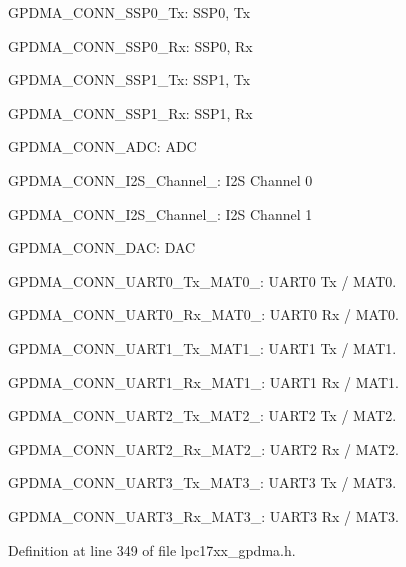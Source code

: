 \begin{DoxyItemize}
\item \-G\-P\-D\-M\-A\-\_\-\-C\-O\-N\-N\-\_\-\-S\-S\-P0\-\_\-\-Tx\-: \-S\-S\-P0, \-Tx
\item \-G\-P\-D\-M\-A\-\_\-\-C\-O\-N\-N\-\_\-\-S\-S\-P0\-\_\-\-Rx\-: \-S\-S\-P0, \-Rx
\item \-G\-P\-D\-M\-A\-\_\-\-C\-O\-N\-N\-\_\-\-S\-S\-P1\-\_\-\-Tx\-: \-S\-S\-P1, \-Tx
\item \-G\-P\-D\-M\-A\-\_\-\-C\-O\-N\-N\-\_\-\-S\-S\-P1\-\_\-\-Rx\-: \-S\-S\-P1, \-Rx
\item \-G\-P\-D\-M\-A\-\_\-\-C\-O\-N\-N\-\_\-\-A\-D\-C\-: \-A\-D\-C
\item \-G\-P\-D\-M\-A\-\_\-\-C\-O\-N\-N\-\_\-\-I2\-S\-\_\-\-Channel\-\_\-: \-I2\-S \-Channel 0
\item \-G\-P\-D\-M\-A\-\_\-\-C\-O\-N\-N\-\_\-\-I2\-S\-\_\-\-Channel\-\_\-: \-I2\-S \-Channel 1
\item \-G\-P\-D\-M\-A\-\_\-\-C\-O\-N\-N\-\_\-\-D\-A\-C\-: \-D\-A\-C
\item \-G\-P\-D\-M\-A\-\_\-\-C\-O\-N\-N\-\_\-\-U\-A\-R\-T0\-\_\-\-Tx\-\_\-\-M\-A\-T0\-\_\-: \-U\-A\-R\-T0 \-Tx / \-M\-A\-T0.
\item \-G\-P\-D\-M\-A\-\_\-\-C\-O\-N\-N\-\_\-\-U\-A\-R\-T0\-\_\-\-Rx\-\_\-\-M\-A\-T0\-\_\-: \-U\-A\-R\-T0 \-Rx / \-M\-A\-T0.
\item \-G\-P\-D\-M\-A\-\_\-\-C\-O\-N\-N\-\_\-\-U\-A\-R\-T1\-\_\-\-Tx\-\_\-\-M\-A\-T1\-\_\-: \-U\-A\-R\-T1 \-Tx / \-M\-A\-T1.
\item \-G\-P\-D\-M\-A\-\_\-\-C\-O\-N\-N\-\_\-\-U\-A\-R\-T1\-\_\-\-Rx\-\_\-\-M\-A\-T1\-\_\-: \-U\-A\-R\-T1 \-Rx / \-M\-A\-T1.
\item \-G\-P\-D\-M\-A\-\_\-\-C\-O\-N\-N\-\_\-\-U\-A\-R\-T2\-\_\-\-Tx\-\_\-\-M\-A\-T2\-\_\-: \-U\-A\-R\-T2 \-Tx / \-M\-A\-T2.
\item \-G\-P\-D\-M\-A\-\_\-\-C\-O\-N\-N\-\_\-\-U\-A\-R\-T2\-\_\-\-Rx\-\_\-\-M\-A\-T2\-\_\-: \-U\-A\-R\-T2 \-Rx / \-M\-A\-T2.
\item \-G\-P\-D\-M\-A\-\_\-\-C\-O\-N\-N\-\_\-\-U\-A\-R\-T3\-\_\-\-Tx\-\_\-\-M\-A\-T3\-\_\-: \-U\-A\-R\-T3 \-Tx / \-M\-A\-T3.
\item \-G\-P\-D\-M\-A\-\_\-\-C\-O\-N\-N\-\_\-\-U\-A\-R\-T3\-\_\-\-Rx\-\_\-\-M\-A\-T3\-\_\-: \-U\-A\-R\-T3 \-Rx / \-M\-A\-T3. 
\end{DoxyItemize}

\-Definition at line 349 of file lpc17xx\-\_\-gpdma.\-h.

